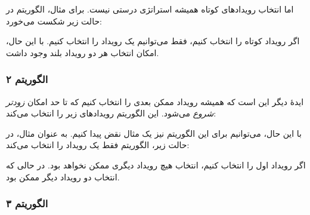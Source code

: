 اما انتخاب رویدادهای کوتاه همیشه
استراتژی درستی نیست. برای مثال، الگوریتم در
حالت زیر شکست می‌خورد:
\begin{center}
\end{center}
اگر رویداد کوتاه را انتخاب کنیم، فقط می‌توانیم یک رویداد را انتخاب کنیم.
با این حال، امکان انتخاب هر دو رویداد بلند وجود داشت.

\subsubsection*{الگوریتم ۲}

ایدهٔ دیگر این است که همیشه رویداد ممکن بعدی را انتخاب کنیم که تا حد امکان \emph{زودتر} \emph{شروع} می‌شود.
این الگوریتم رویدادهای زیر را انتخاب می‌کند:
\begin{center}
\end{center}

با این حال، می‌توانیم برای این الگوریتم نیز یک مثال نقض پیدا کنیم.
به عنوان مثال، در حالت زیر،
الگوریتم فقط یک رویداد را انتخاب می‌کند:
\begin{center}
\end{center}
اگر رویداد اول را انتخاب کنیم، انتخاب هیچ رویداد دیگری ممکن نخواهد بود.
در حالی که انتخاب دو رویداد دیگر ممکن بود.

\subsubsection*{الگوریتم ۳}

